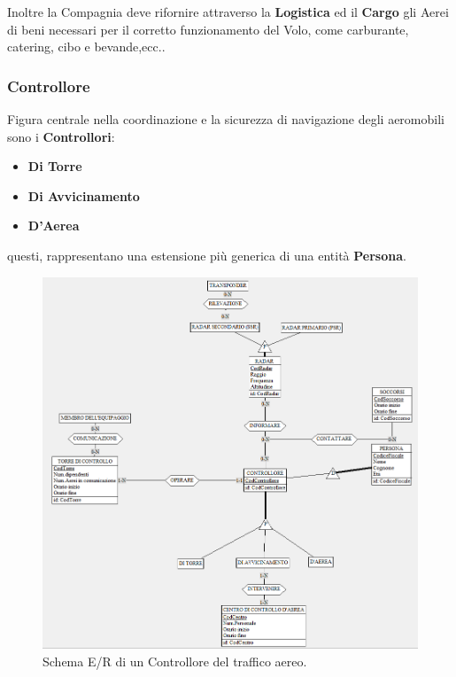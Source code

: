 \textsf{\small Inoltre la Compagnia deve rifornire attraverso la \textbf{Logistica} ed il \textbf{Cargo} gli Aerei di beni necessari per il corretto funzionamento del Volo, come carburante, catering, cibo e bevande,ecc..}\\


\newpage

\enlargethispage{1\linewidth}

\subsubsection{Controllore}

\textsf{\small Figura centrale nella coordinazione e la sicurezza di navigazione degli aeromobili sono i \textbf{Controllori}: }\\
\begin{itemize}
	\item \textbf{\small Di Torre}
	\item \textbf{\small Di Avvicinamento}
	\item \textbf{\small D'Aerea}
\end{itemize}

\textsf{\small questi, rappresentano una estensione più generica di una entità \textbf{Persona}.}\\

\begin{figure}[H] %
	\centering
	\includegraphics[width=1.2\linewidth, height=1.2\textheight, keepaspectratio]{./img/Controllore.png}
	\caption{Schema E/R di un Controllore del traffico aereo.}
	\label{fig:schema_controllore}
\end{figure}


